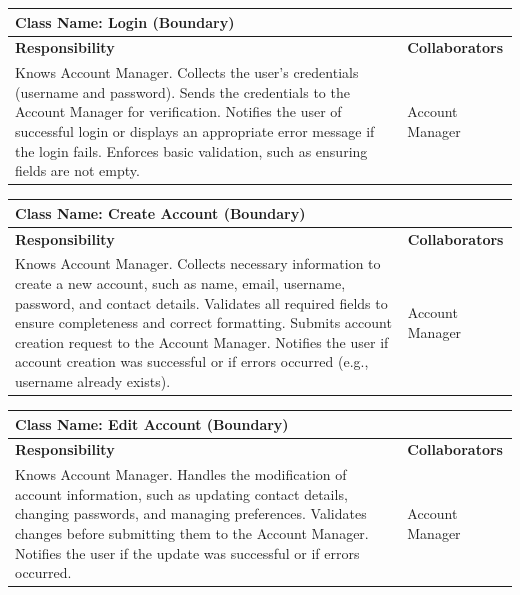 \documentclass[]{article}
\begin{document}
	\begin{table}[H]
		\centering
		\begin{tabular}{|p{8cm}|p{8cm}|}
		\hline 
		\multicolumn{2}{|l|}{\textbf{Class Name:} Login (Boundary)} \\
		\hline
		\textbf{Responsibility} & \textbf{Collaborators} \\
		\hline
		Knows Account Manager. \newline
		Collects the user's credentials (username and password). \newline
		Sends the credentials to the Account Manager for verification. \newline
		Notifies the user of successful login or displays an appropriate error message if the login fails. \newline
		Enforces basic validation, such as ensuring fields are not empty. 
		& Account Manager \\
		\hline
		\end{tabular}
	\end{table}

	\begin{table}[H]
		\centering
		\begin{tabular}{|p{8cm}|p{8cm}|}
		\hline 
		\multicolumn{2}{|l|}{\textbf{Class Name:} Create Account (Boundary)} \\
		\hline
		\textbf{Responsibility} & \textbf{Collaborators} \\
		\hline
		Knows Account Manager. \newline
		Collects necessary information to create a new account, such as name, email, username, password, and contact details. \newline
		Validates all required fields to ensure completeness and correct formatting. \newline
		Submits account creation request to the Account Manager. \newline
		Notifies the user if account creation was successful or if errors occurred (e.g., username already exists). 
		& Account Manager \\
		\hline
		\end{tabular}
	\end{table}

	\begin{table}[H]
		\centering
		\begin{tabular}{|p{8cm}|p{8cm}|}
		\hline 
		\multicolumn{2}{|l|}{\textbf{Class Name:} Edit Account (Boundary)} \\
		\hline
		\textbf{Responsibility} & \textbf{Collaborators} \\
		\hline
		Knows Account Manager. \newline
		Handles the modification of account information, such as updating contact details, changing passwords, and managing preferences. \newline
		Validates changes before submitting them to the Account Manager. \newline
		Notifies the user if the update was successful or if errors occurred. 
		& Account Manager \\
		\hline
		\end{tabular}
	\end{table}
\end{document}
